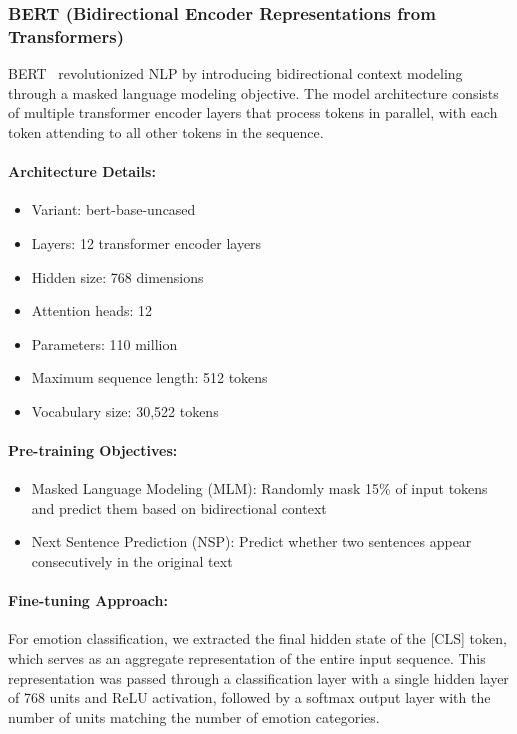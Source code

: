 \documentclass[12pt]{article}
\begin{document}
\subsubsection{BERT (Bidirectional Encoder Representations from Transformers)}
BERT~\cite{devlin2018bert} revolutionized NLP by introducing bidirectional context modeling through a masked language modeling objective. The model architecture consists of multiple transformer encoder layers that process tokens in parallel, with each token attending to all other tokens in the sequence.

\paragraph{Architecture Details:}
\begin{itemize}
    \item Variant: bert-base-uncased
    \item Layers: 12 transformer encoder layers
    \item Hidden size: 768 dimensions
    \item Attention heads: 12
    \item Parameters: 110 million
    \item Maximum sequence length: 512 tokens
    \item Vocabulary size: 30,522 tokens
\end{itemize}

\paragraph{Pre-training Objectives:}
\begin{itemize}
    \item Masked Language Modeling (MLM): Randomly mask 15\% of input tokens and predict them based on bidirectional context
    \item Next Sentence Prediction (NSP): Predict whether two sentences appear consecutively in the original text
\end{itemize}

\paragraph{Fine-tuning Approach:}
For emotion classification, we extracted the final hidden state of the [CLS] token, which serves as an aggregate representation of the entire input sequence. This representation was passed through a classification layer with a single hidden layer of 768 units and ReLU activation, followed by a softmax output layer with the number of units matching the number of emotion categories.
\end{document}
